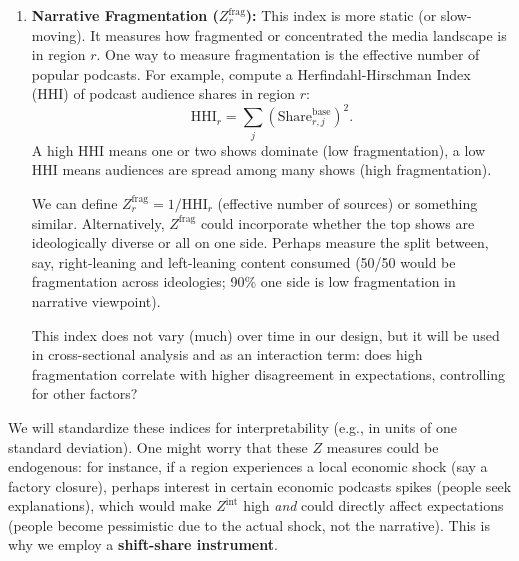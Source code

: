 \documentclass[12pt]{article}
\begin{document}
\begin{enumerate}
          $Z^{\text{dir}}$ will tell us whether a region is more exposed to, say, a conservative economic narrative (positive value) or a liberal narrative (negative value) at time $t$. This is important because the nature of expectation bias might depend on direction. For instance, one narrative might consistently predict higher inflation (e.g., those worried about government deficits might always warn of inflation), while another might downplay inflation. If our outcome of interest is inflation expectations, $Z^{\text{dir}}$ could explain whether a region expects higher or lower inflation bias.

          We will likely interact $Z^{\text{dir}}$ with the sign of forecast errors to test if, for example, Republican-leaning narratives cause over-prediction of growth when a Democrat is in office (just as a hypothetical pattern).

    \item \textbf{Narrative Fragmentation ($Z^{\text{frag}}_{r}$):} This index is more static (or slow-moving). It measures how fragmented or concentrated the media landscape is in region $r$. One way to measure fragmentation is the effective number of popular podcasts. For example, compute a Herfindahl-Hirschman Index (HHI) of podcast audience shares in region $r$:
          \[
              \text{HHI}_r = \sum_{j} (\text{Share}_{r,j}^{\text{base}})^2.
          \]
          A high HHI means one or two shows dominate (low fragmentation), a low HHI means audiences are spread among many shows (high fragmentation).

          We can define $Z^{\text{frag}}_r = 1/\text{HHI}_r$ (effective number of sources) or something similar. Alternatively, $Z^{\text{frag}}$ could incorporate whether the top shows are ideologically diverse or all on one side. Perhaps measure the split between, say, right-leaning and left-leaning content consumed (50/50 would be fragmentation across ideologies; 90\% one side is low fragmentation in narrative viewpoint).

          This index does not vary (much) over time in our design, but it will be used in cross-sectional analysis and as an interaction term: does high fragmentation correlate with higher disagreement in expectations, controlling for other factors?
\end{enumerate}


We will standardize these indices for interpretability (e.g., in units of one standard deviation).
One might worry that these $Z$ measures could be endogenous: for instance, if a region experiences a local economic shock (say a factory closure), perhaps interest in certain economic podcasts spikes (people seek explanations), which would make $Z^{\text{int}}$ high \emph{and} could directly affect expectations (people become pessimistic due to the actual shock, not the narrative). This is why we employ a \textbf{shift-share instrument}.
\end{document}

